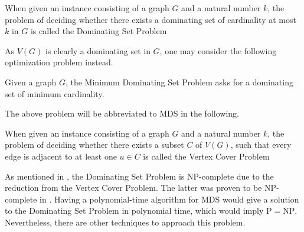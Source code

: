 \begin{definition}
When given an instance consisting of a graph $G$ and a natural number $k$, the problem of deciding whether there exists a dominating set of cardinality at most $k$ in $G$ is called the Dominating Set Problem \cite{Garey90}
\end{definition}
As $V(G)$ is clearly a dominating set in $G$, one may consider the following optimization problem instead.
\begin{definition}
Given a graph $G$, the Minimum Dominating Set Problem asks for a dominating set of minimum cardinality.
\end{definition}
The above problem will be abbreviated to MDS in the following.
\begin{definition}
When given an instance consisting of a graph $G$ and a natural number $k$, the problem of deciding whether there exists a subset $C$ of $V(G)$, such that every edge is adjacent to at least one $u \in C$  is called the Vertex Cover Problem \cite{Garey90}
\end{definition}
As mentioned in \citeauthor{Garey90} \cite{Garey90}, the Dominating Set Problem is NP-complete due to the reduction from the Vertex Cover Problem. The latter was proven to be NP-complete in \cite{Karp1972}. Having a polynomial-time algorithm for MDS would give a solution to the Dominating Set Problem in polynomial time, which would imply $\mathrm{P} = \mathrm{NP}$. Nevertheless, there are other techniques to approach this problem. 
